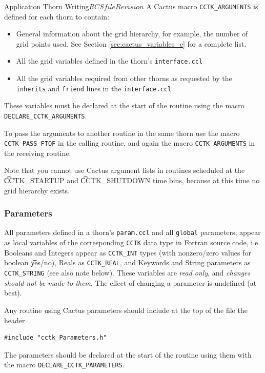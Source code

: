 \begin{cactuspart}{Application Thorn Writing}{$RCSfile$}{$Revision$}
A Cactus macro \texttt{CCTK\_ARGUMENTS} is defined for each thorn
to contain:
\begin{itemize}
\item General information about the grid hierarchy, for example, the number
      of grid points used. See Section \ref{sec:cactus_variables_c} for a
      complete list.
\item All the grid variables defined in the thorn's \texttt{interface.ccl}
\item All the grid variables required from other thorns as requested by
      the \texttt{inherits} and \texttt{friend} lines in the \texttt{interface.ccl}
\end{itemize}
These variables must be declared at the start of the routine using
the macro \texttt{DECLARE\_CCTK\_ARGUMENTS}.

To pass the arguments to another routine in the same thorn use the macro
\texttt{CCTK\_PASS\_FTOF} in the calling routine, and again the macro
\texttt{CCTK\_ARGUMENTS} in the receiving routine.

Note that you cannot use Cactus argument lists in routines scheduled at the
{\t CCTK\_STARTUP} and {\t CCTK\_SHUTDOWN} time bins, because at this time
no grid hierarchy exists.


\subsubsection{Parameters}

All parameters defined in a thorn's \texttt{param.ccl} and all \texttt{global}
parameters, appear as local variables of the corresponding \texttt{CCTK} data type
in Fortran source code, i.e. Booleans and Integers appear as \texttt{CCTK\_INT}
types (with nonzero/zero values for boolean {\t yes/no}),
Reals as \texttt{CCTK\_REAL}, and Keywords and String parameters as
\texttt{CCTK\_STRING} (see
also note below). These variables are \emph{read only}, and \emph{changes should
not be made to them}. The effect of changing a parameter is undefined (at best).

Any routine using Cactus parameters should include at
the top of the file the header
\begin{verbatim}
#include "cctk_Parameters.h"
\end{verbatim}

The parameters should be declared at the start of the routine
using them with the macro \texttt{DECLARE\_CCTK\_PARAMETERS}.


\end{cactuspart}
